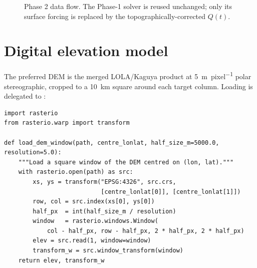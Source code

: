 \begin{figure}[H]
\centering
{}
\caption[Phase 2 data flow]{Phase 2 data flow.  The Phase-1 solver is
  reused unchanged; only its surface forcing is replaced by the
  topographically-corrected $Q(t)$.}
\label{fig:phase2-flow}
\end{figure}

\section{Digital elevation model}

The preferred DEM is the merged LOLA/Kaguya product
\citep{barker2016,araki2009} at \SI{5}{\meter\per pixel} polar
stereographic, cropped to a \SI{10}{\kilo\meter} square around each
target column.  Loading is delegated to :

\begin{lstlisting}[caption={DEM loader from \code{lunar/dem.py}.},label={lst:dem_load}]
import rasterio
from rasterio.warp import transform

def load_dem_window(path, centre_lonlat, half_size_m=5000.0, resolution=5.0):
    """Load a square window of the DEM centred on (lon, lat)."""
    with rasterio.open(path) as src:
        xs, ys = transform("EPSG:4326", src.crs,
                           [centre_lonlat[0]], [centre_lonlat[1]])
        row, col = src.index(xs[0], ys[0])
        half_px  = int(half_size_m / resolution)
        window   = rasterio.windows.Window(
            col - half_px, row - half_px, 2 * half_px, 2 * half_px)
        elev = src.read(1, window=window)
        transform_w = src.window_transform(window)
    return elev, transform_w
\end{lstlisting}

